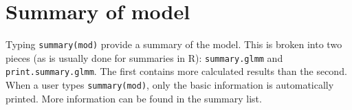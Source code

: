 \documentclass{article}
\begin{document}
%
%

\section{Summary of model}
Typing \texttt{summary(mod)}  provide a summary of the model. This is broken into two pieces (as is usually done for summaries in R):  \texttt{summary.glmm} and \texttt{print.summary.glmm}. The first contains more calculated results than the second. When a user types \texttt{summary(mod)}, only the  basic information is automatically printed. More information can be found in the summary list.
\end{document}
